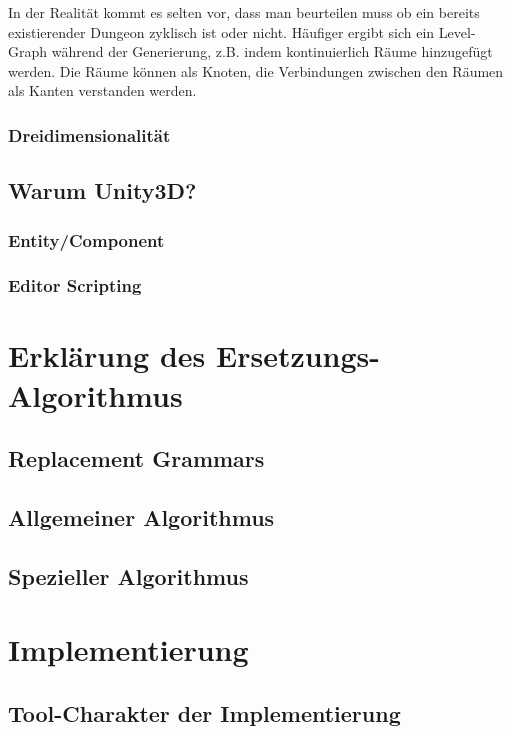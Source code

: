 In der Realität kommt es selten vor, dass man beurteilen muss ob ein bereits existierender Dungeon zyklisch ist oder nicht. Häufiger ergibt sich ein Level-Graph während der Generierung, z.B. indem kontinuierlich Räume hinzugefügt werden. Die Räume können als Knoten, die Verbindungen zwischen den Räumen als Kanten verstanden werden.

\subsection{Dreidimensionalität}

\section{Warum Unity3D?}

\subsection{Entity/Component}

\subsection{Editor Scripting}


\chapter{Erklärung des Ersetzungs-Algorithmus}

\section{Replacement Grammars}

\section{Allgemeiner Algorithmus}

\section{Spezieller Algorithmus}


\chapter{Implementierung}


\section{Tool-Charakter der Implementierung}

